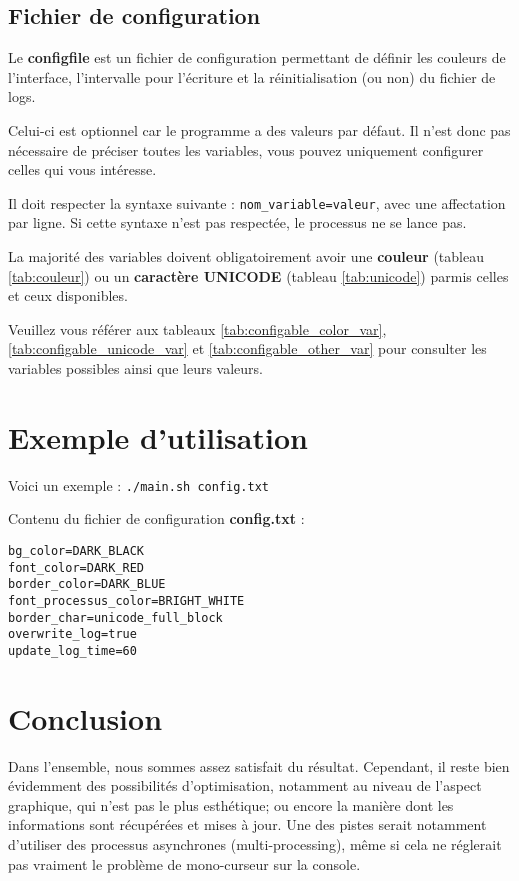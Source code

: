 \documentclass{article}
\begin{document}
\subsection{Fichier de configuration}
Le \textbf{configfile} est un fichier de configuration permettant de définir les couleurs de l'interface, l'intervalle pour l'écriture et la réinitialisation (ou non) du fichier de logs.
  
Celui-ci est optionnel car le programme a des valeurs par défaut. Il n'est donc pas nécessaire de préciser toutes les variables, vous pouvez uniquement configurer celles qui vous intéresse.
\vspace{1em}
  
Il doit respecter la syntaxe suivante : \texttt{nom\_variable=valeur}, avec une affectation par ligne. Si cette syntaxe n'est pas respectée, le processus ne se lance pas.
\vspace{1em}

La majorité des variables doivent obligatoirement avoir une \textbf{couleur} (tableau \ref{tab:couleur}) ou un \textbf{caractère UNICODE} (tableau \ref{tab:unicode}) parmis celles et ceux disponibles.
  
Veuillez vous référer aux tableaux \ref{tab:configable_color_var}, \ref{tab:configable_unicode_var} et \ref{tab:configable_other_var} pour consulter les variables possibles ainsi que leurs valeurs.

\section{Exemple d'utilisation}
Voici un exemple : \texttt{./main.sh config.txt}
  
\vspace{0.5em}
Contenu du fichier de configuration \textbf{config.txt} :
\begin{verbatim}
bg_color=DARK_BLACK
font_color=DARK_RED
border_color=DARK_BLUE
font_processus_color=BRIGHT_WHITE
border_char=unicode_full_block
overwrite_log=true
update_log_time=60
\end{verbatim}

\newpage
\section{Conclusion}
Dans l'ensemble, nous sommes assez satisfait du résultat. Cependant, il reste bien évidemment des possibilités d'optimisation, notamment au niveau de l'aspect graphique, qui n'est pas le plus esthétique;
ou encore la manière dont les informations sont récupérées et mises à jour. 
Une des pistes serait notamment d'utiliser des processus asynchrones (multi-processing), même si cela ne réglerait pas vraiment le problème de mono-curseur sur la console.
  
\end{document}
